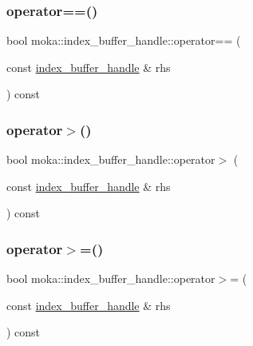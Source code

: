 \mbox{\label{structmoka_1_1index__buffer__handle_a72330025c9b54275476c8cd789e7c262}} 
\subsubsection{\texorpdfstring{operator==()}{operator==()}\hspace{0.1cm}{\footnotesize\ttfamily [2/2]}}
{\footnotesize\ttfamily bool moka\+::index\+\_\+buffer\+\_\+handle\+::operator== (\begin{DoxyParamCaption}\item[{const \mbox{\hyperlink{structmoka_1_1index__buffer__handle}{index\+\_\+buffer\+\_\+handle}} \&}]{rhs }\end{DoxyParamCaption}) const}

\mbox{\label{structmoka_1_1index__buffer__handle_a213d8badf6bc91e87f56ad65cbb1bc1c}} 
\subsubsection{\texorpdfstring{operator$>$()}{operator>()}}
{\footnotesize\ttfamily bool moka\+::index\+\_\+buffer\+\_\+handle\+::operator$>$ (\begin{DoxyParamCaption}\item[{const \mbox{\hyperlink{structmoka_1_1index__buffer__handle}{index\+\_\+buffer\+\_\+handle}} \&}]{rhs }\end{DoxyParamCaption}) const}

\mbox{\label{structmoka_1_1index__buffer__handle_a8df77d2edae6e60e7a9abb325a56aa7f}} 
\subsubsection{\texorpdfstring{operator$>$=()}{operator>=()}}
{\footnotesize\ttfamily bool moka\+::index\+\_\+buffer\+\_\+handle\+::operator$>$= (\begin{DoxyParamCaption}\item[{const \mbox{\hyperlink{structmoka_1_1index__buffer__handle}{index\+\_\+buffer\+\_\+handle}} \&}]{rhs }\end{DoxyParamCaption}) const}



